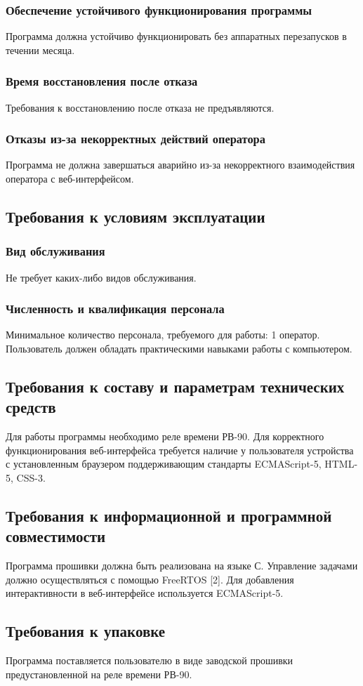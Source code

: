 \subsubsection{Обеспечение устойчивого функционирования программы}
Программа должна устойчиво функционировать без аппаратных перезапусков в течении месяца.

\subsubsection{Время восстановления после отказа}
Требования к восстановлению после отказа не предъявляются.

\subsubsection{Отказы из-за некорректных действий оператора}
Программа не должна завершаться аварийно из-за некорректного взаимодействия оператора с веб-интерфейсом.


\subsection{Требования к условиям эксплуатации}
\subsubsection{Вид обслуживания}
Не требует каких-либо видов обслуживания.

\subsubsection{Численность и квалификация персонала}
Минимальное количество персонала, требуемого для работы: 1 оператор. Пользователь должен обладать практическими навыками работы с компьютером.

\subsection{Требования к составу и параметрам технических средств}
Для работы программы необходимо реле времени РВ-90. Для корректного функционирования веб-интерфейса требуется наличие у пользователя устройства с установленным браузером поддерживающим стандарты ECMAScript-5, HTML-5, CSS-3.


\subsection{Требования к информационной и программной совместимости}
Программа прошивки должна быть реализована на языке С. Управление задачами должно осуществляться с помощью FreeRTOS [2]. Для добавления интерактивности в веб-интерфейсе используется ECMAScript-5.


\subsection{Требования к упаковке}
Программа поставляется пользователю в виде заводской прошивки предустановленной на реле времени РВ-90.
